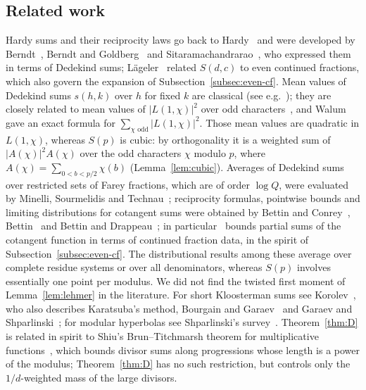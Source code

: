 \subsection{Related work}\label{subsec:related}
Hardy sums and their reciprocity laws go back to Hardy~\cite{b14} and were developed by Berndt~\cite{b2}, Berndt and Goldberg~\cite{b3} and Sitaramachandrarao~\cite{b26}, who expressed them in terms of Dedekind sums; L\"ageler~\cite{b18} related $S(d,c)$ to even continued fractions, which also govern the expansion of Subsection~\ref{subsec:even-cf}. Mean values of Dedekind sums $s(h,k)$ over $h$ for fixed $k$ are classical (see e.g.~\cite{b10}); they are closely related to mean values of $|L(1,\chi)|^2$ over odd characters~\cite{b31}, and Walum~\cite{b28} gave an exact formula for $\sum_{\chi\text{ odd}}|L(1,\chi)|^2$. Those mean values are quadratic in $L(1,\chi)$, whereas $S(p)$ is cubic: by orthogonality it is a weighted sum of $|A(\chi)|^2A(\chi)$ over the odd characters $\chi$ modulo $p$, where $A(\chi)=\sum_{0<b<p/2}\chi(b)$ (Lemma~\ref{lem:cubic}). Averages of Dedekind sums over restricted sets of Farey fractions, which are of order $\log Q$, were evaluated by Minelli, Sourmelidis and Technau~\cite{b19}; reciprocity formulas, pointwise bounds and limiting distributions for cotangent sums were obtained by Bettin and Conrey~\cite{b5}, Bettin~\cite{b4} and Bettin and Drappeau~\cite{b6,b7}; in particular~\cite{b6} bounds partial sums of the cotangent function in terms of continued fraction data, in the spirit of Subsection~\ref{subsec:even-cf}. The distributional results among these average over complete residue systems or over all denominators, whereas $S(p)$ involves essentially one point per modulus. We did not find the twisted first moment of Lemma~\ref{lem:lehmer} in the literature. For short Kloosterman sums see Korolev~\cite{b17}, who also describes Karatsuba's method, Bourgain and Garaev~\cite{b8,b9} and Garaev and Shparlinski~\cite{b12}; for modular hyperbolas see Shparlinski's survey~\cite{b25}. Theorem~\ref{thm:D} is related in spirit to Shiu's Brun--Titchmarsh theorem for multiplicative functions~\cite{b24}, which bounds divisor sums along progressions whose length is a power of the modulus; Theorem~\ref{thm:D} has no such restriction, but controls only the $1/d$-weighted mass of the large divisors.


